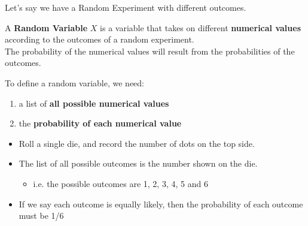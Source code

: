 \documentclass[smaller, handout]{beamer}\usepackage[]{graphicx}\usepackage[]{color}
\newenvironment{stepenumerate}{\begin{enumerate}[<+->]}{\end{enumerate}}
\begin{document}
\begin{frame}{\secname}


  Let's say we have a Random Experiment with different outcomes.

  \begin{definition}[Informal]
  A \textbf{Random Variable} $X$ is a variable that takes on different
  \textbf{numerical values} according to the outcomes of a random experiment.\\

  The probability of the numerical values will result from the probabilities of
  the outcomes.
  \end{definition}

  To define a random variable, we need:

  \begin{stepenumerate}
  \item a list of \textbf{all possible numerical values}
  \item the \textbf{probability of each numerical value}
  \end{stepenumerate}
\end{frame}

\begin{frame}{\secname}
  \begin{example}
  \begin{itemize}
  \item Roll a single die, and record the number of dots on the top side.
  \item The list of all possible outcomes is the number shown on the die.
  \begin{itemize}
  \item i.e. the possible outcomes are 1, 2, 3, 4, 5 and 6
  \end{itemize}
  \item If we say each outcome is equally likely, then the probability of each outcome must be 1/6
  \end{itemize}
  \vspace{3cm}
  \end{example}
\end{frame}
\end{document}
